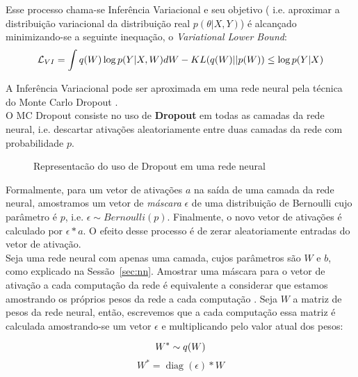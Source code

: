 Esse processo chama-se Inferência Variacional e seu objetivo ( i.e. aproximar a distribuição variacional da distribuição real $p(\theta | X,Y)$)
é alcançado minimizando-se a seguinte inequação, o \textit{Variational Lower Bound}: \\

\begin{equation}
  \label {eq:ine}
  \mathcal{L}_{VI} = \int q(W) \log p(Y | X,W)dW - \mathnormal{KL}(q(W) ||p(W)) \\
                  \leq \log p(Y|X) 
\end{equation}


A Inferência Variacional pode ser aproximada em uma rede neural pela técnica do Monte Carlo Dropout \citep{dropbayes}. \\

O MC Dropout consiste no uso de \textbf{Dropout} em todas as camadas da rede
neural, i.e. descartar ativações aleatoriamente entre duas camadas da rede com
probabilidade $p$.\\

\begin{figure}
  \centering
  
  \label{fig:dropout}
  \caption{Representacão do uso de Dropout em uma rede neural}
\end{figure}

Formalmente, para um vetor de ativações $a$ na saída de uma
camada da rede neural, amostramos um vetor de \textit{máscara} $\epsilon$ de uma
distribuição de Bernoulli cujo parâmetro é $p$, i.e. $\epsilon \sim Bernoulli(p)$.
Finalmente, o novo vetor de ativações é calculado por $\epsilon * a$. O efeito desse
processo é de zerar aleatoriamente entradas do vetor de ativação.
\\

Seja uma rede neural com apenas uma camada, cujos parâmetros são $W$ e $b$, como explicado na Sessão~\ref{sec:nn}. Amostrar uma máscara para o vetor de ativação a cada computação da rede é equivalente a considerar que estamos amostrando os próprios pesos da rede a cada computação \cite{dropbayes}. Seja $W$ a matriz de pesos da rede neural, então, escrevemos que a cada computação essa matriz é calculada amostrando-se um vetor $\epsilon$ e multiplicando pelo valor atual dos pesos: \\

\newcommand{\diag}{\mathop{\mathrm{diag}}}

$$    W^*   \sim \mathnormal{q}(W) $$
$$    W^*  = \diag(\epsilon) * W $$


